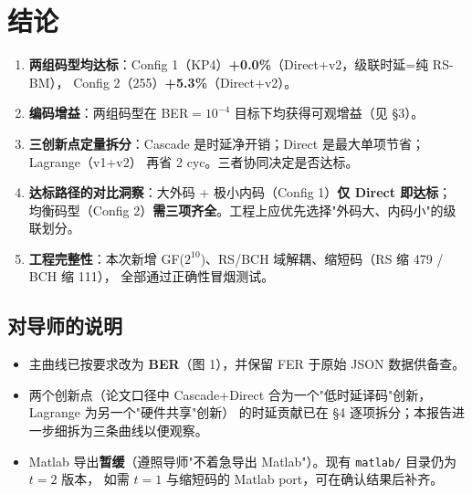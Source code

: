 \documentclass[11pt,a4paper]{article}
\begin{document}
\section{结论}

\begin{keybox}[title=\textbf{核心成果}]
\begin{enumerate}[leftmargin=1.5em, itemsep=2pt]
\item \textbf{两组码型均达标}：Config 1（KP4）\textbf{+0.0\%}（Direct+v2，级联时延=纯 RS-BM），
      Config 2（255）\textbf{+5.3\%}（Direct+v2）。
\item \textbf{编码增益}：两组码型在 BER$=10^{-4}$ 目标下均获得可观增益（见 §3）。
\item \textbf{三创新点定量拆分}：Cascade 是时延净开销；Direct 是最大单项节省；Lagrange（v1+v2）
      再省 2 cyc。三者协同决定是否达标。
\item \textbf{达标路径的对比洞察}：大外码 + 极小内码（Config 1）\textbf{仅 Direct 即达标}；
      均衡码型（Config 2）\textbf{需三项齐全}。工程上应优先选择"外码大、内码小"的级联划分。
\item \textbf{工程完整性}：本次新增 GF($2^{10}$)、RS/BCH 域解耦、缩短码（RS 缩 479 / BCH 缩 111），
      全部通过正确性冒烟测试。
\end{enumerate}
\end{keybox}

\subsection{对导师的说明}

\begin{itemize}[leftmargin=1.5em, itemsep=1pt]
\item 主曲线已按要求改为 \textbf{BER}（图 1），并保留 FER 于原始 JSON 数据供备查。
\item 两个创新点（论文口径中 Cascade+Direct 合为一个"低时延译码"创新，Lagrange 为另一个"硬件共享"创新）
      的时延贡献已在 §4 逐项拆分；本报告进一步细拆为三条曲线以便观察。
\item Matlab 导出\textbf{暂缓}（遵照导师"不着急导出 Matlab"）。现有 \texttt{matlab/} 目录仍为 $t{=}2$ 版本，
      如需 $t{=}1$ 与缩短码的 Matlab port，可在确认结果后补齐。
\end{itemize}
\end{document}
